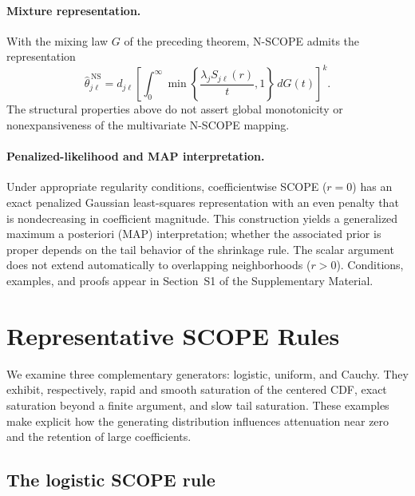 \documentclass[12pt]{article}
\theoremstyle{definition}
\theoremstyle{definition}
\begin{document}
\paragraph{Mixture representation.}
With the mixing law $G$ of the preceding theorem, N-SCOPE admits the
representation
\begin{equation}
\widehat\theta_{j\ell}^{\,\mathrm{NS}}
=d_{j\ell}\left[\int_0^\infty
\min\!\left\{\frac{\lambda_jS_{j\ell}(r)}{t},1\right\}
\,dG(t)\right]^k.
\label{eq:nscope-mixture}
\end{equation}
The structural properties above do not assert global monotonicity or
nonexpansiveness of the multivariate N-SCOPE mapping.

\paragraph{Penalized-likelihood and MAP interpretation.}
Under appropriate regularity conditions, coefficientwise SCOPE
($r=0$) has an exact penalized Gaussian least-squares representation
with an even penalty that is nondecreasing in coefficient magnitude.
This construction yields a generalized maximum a posteriori (MAP)
interpretation; whether the associated prior is proper depends on
the tail behavior of the shrinkage rule. The scalar argument does not
extend automatically to overlapping neighborhoods ($r>0$).
Conditions, examples, and proofs appear in Section~S1 of the
Supplementary Material.

\section{Representative SCOPE Rules}
\label{sec:rules}

We examine three complementary generators: logistic, uniform, and
Cauchy. They exhibit, respectively, rapid and smooth saturation of
the centered CDF, exact saturation beyond a finite argument, and
slow tail saturation. These examples make explicit how the generating
distribution influences attenuation near zero and the retention of
large coefficients.

\subsection{The logistic SCOPE rule}
\end{document}
